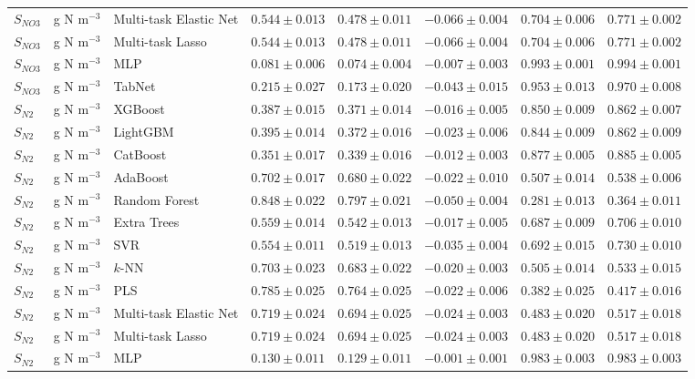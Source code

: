 \begin{longtable}{llp{3.1cm}rrrrr}
$S_{NO3}$ & g N m$^{-3}$ & Multi-task Elastic Net & $0.544\pm0.013$ & $0.478\pm0.011$ & $-0.066\pm0.004$ & $0.704\pm0.006$ & $0.771\pm0.002$ \\
$S_{NO3}$ & g N m$^{-3}$ & Multi-task Lasso & $0.544\pm0.013$ & $0.478\pm0.011$ & $-0.066\pm0.004$ & $0.704\pm0.006$ & $0.771\pm0.002$ \\
$S_{NO3}$ & g N m$^{-3}$ & MLP & $0.081\pm0.006$ & $0.074\pm0.004$ & $-0.007\pm0.003$ & $0.993\pm0.001$ & $0.994\pm0.001$ \\
$S_{NO3}$ & g N m$^{-3}$ & TabNet & $0.215\pm0.027$ & $0.173\pm0.020$ & $-0.043\pm0.015$ & $0.953\pm0.013$ & $0.970\pm0.008$ \\
$S_{N2}$ & g N m$^{-3}$ & XGBoost & $0.387\pm0.015$ & $0.371\pm0.014$ & $-0.016\pm0.005$ & $0.850\pm0.009$ & $0.862\pm0.007$ \\
$S_{N2}$ & g N m$^{-3}$ & LightGBM & $0.395\pm0.014$ & $0.372\pm0.016$ & $-0.023\pm0.006$ & $0.844\pm0.009$ & $0.862\pm0.009$ \\
$S_{N2}$ & g N m$^{-3}$ & CatBoost & $0.351\pm0.017$ & $0.339\pm0.016$ & $-0.012\pm0.003$ & $0.877\pm0.005$ & $0.885\pm0.005$ \\
$S_{N2}$ & g N m$^{-3}$ & AdaBoost & $0.702\pm0.017$ & $0.680\pm0.022$ & $-0.022\pm0.010$ & $0.507\pm0.014$ & $0.538\pm0.006$ \\
$S_{N2}$ & g N m$^{-3}$ & Random Forest & $0.848\pm0.022$ & $0.797\pm0.021$ & $-0.050\pm0.004$ & $0.281\pm0.013$ & $0.364\pm0.011$ \\
$S_{N2}$ & g N m$^{-3}$ & Extra Trees & $0.559\pm0.014$ & $0.542\pm0.013$ & $-0.017\pm0.005$ & $0.687\pm0.009$ & $0.706\pm0.010$ \\
$S_{N2}$ & g N m$^{-3}$ & SVR & $0.554\pm0.011$ & $0.519\pm0.013$ & $-0.035\pm0.004$ & $0.692\pm0.015$ & $0.730\pm0.010$ \\
$S_{N2}$ & g N m$^{-3}$ & $k$-NN & $0.703\pm0.023$ & $0.683\pm0.022$ & $-0.020\pm0.003$ & $0.505\pm0.014$ & $0.533\pm0.015$ \\
$S_{N2}$ & g N m$^{-3}$ & PLS & $0.785\pm0.025$ & $0.764\pm0.025$ & $-0.022\pm0.006$ & $0.382\pm0.025$ & $0.417\pm0.016$ \\
$S_{N2}$ & g N m$^{-3}$ & Multi-task Elastic Net & $0.719\pm0.024$ & $0.694\pm0.025$ & $-0.024\pm0.003$ & $0.483\pm0.020$ & $0.517\pm0.018$ \\
$S_{N2}$ & g N m$^{-3}$ & Multi-task Lasso & $0.719\pm0.024$ & $0.694\pm0.025$ & $-0.024\pm0.003$ & $0.483\pm0.020$ & $0.517\pm0.018$ \\
$S_{N2}$ & g N m$^{-3}$ & MLP & $0.130\pm0.011$ & $0.129\pm0.011$ & $-0.001\pm0.001$ & $0.983\pm0.003$ & $0.983\pm0.003$ \\

\end{longtable}
